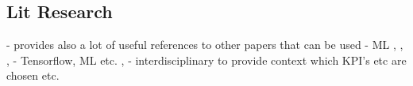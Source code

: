 \subsection{Lit Research}
\cite{review_ml_styles} - provides also a lot of useful references to other papers that can be used 
\newline
\cite{prediction_stock_market} - ML 
\newline
\cite{hands_on_ML}, \cite{intro_ml}, \cite{tf_ctr},  \cite{bd_tf_price_forecasting} - Tensorflow, ML etc. 
\newline
\cite{kpi_imrpove_businiess}, \cite{kpi_imrpove_decision_making} - interdisciplinary to provide context which KPI's etc are chosen etc. 

